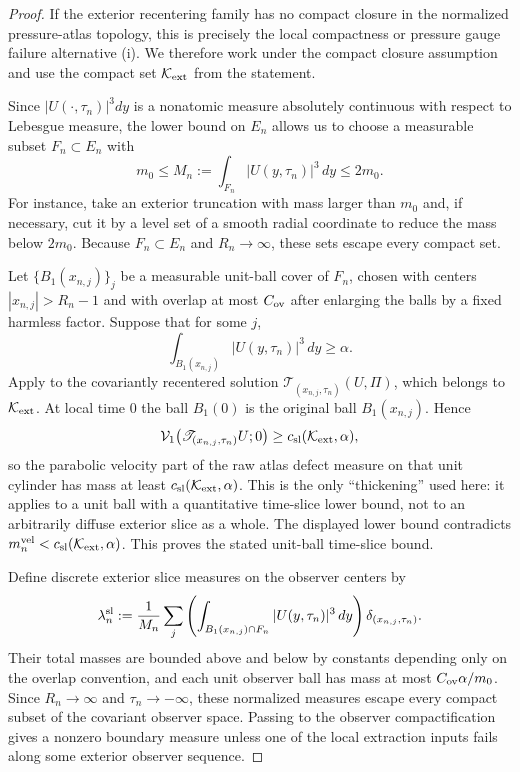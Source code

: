 \documentclass[11pt]{amsart}
\numberwithin{equation}{section}
\theoremstyle{plain}
\theoremstyle{definition}
\theoremstyle{remark}
\newcommand{\Vel}{\mathcal V}
\newcommand{\calK}{\mathcal K}
\begin{document}
\begin{proof}
If the exterior recentering family has no compact closure in the normalized
pressure-atlas topology, this is precisely the local compactness or pressure
gauge failure alternative \textup{(i)}.  We therefore work under the compact
closure assumption and use the compact set \(\calK_{\rm ext}\) from the
statement.

Since \(|U(\cdot,\tau_n)|^3dy\) is a nonatomic measure absolutely continuous
with respect to Lebesgue measure, the lower bound on \(E_n\) allows us to
choose a measurable subset \(F_n\subset E_n\) with
\[
   m_0\le M_n:=\int_{F_n}|U(y,\tau_n)|^3\,dy\le2m_0 .
\]
For instance, take an exterior truncation with mass larger than \(m_0\) and,
if necessary, cut it by a level set of a smooth radial coordinate to reduce the
mass below \(2m_0\).  Because \(F_n\subset E_n\) and \(R_n\to\infty\), these
sets escape every compact set.

Let \(\{B_1(x_{n,j})\}_j\) be a measurable unit-ball cover of \(F_n\), chosen
with centers \(|x_{n,j}|>R_n-1\) and with overlap at most \(C_{\rm ov}\) after
enlarging the balls by a fixed harmless factor.  Suppose that for some \(j\),
\[
   \int_{B_1(x_{n,j})}|U(y,\tau_n)|^3\,dy\ge\alpha .
\]
Apply  to the covariantly recentered
solution \(\mathscr T_{(x_{n,j},\tau_n)}(U,\Pi)\), which belongs to
\(\calK_{\rm ext}\).  At local time \(0\) the ball \(B_1(0)\) is the original
ball \(B_1(x_{n,j})\).  Hence
\[
   \Vel_1\!\left(\mathscr T_{(x_{n,j},\tau_n)}U;0\right)
   \ge c_{\rm sl}(\calK_{\rm ext},\alpha),
\]
so the parabolic velocity part of the raw atlas defect measure on that unit
cylinder has mass at least \(c_{\rm sl}(\calK_{\rm ext},\alpha)\).  This is the only
``thickening'' used here: it applies to a unit ball with a quantitative
time-slice lower bound, not to an arbitrarily diffuse exterior slice as a
whole.  The displayed lower bound contradicts
\(m_n^{\rm vel}<c_{\rm sl}(\calK_{\rm ext},\alpha)\).  This proves the stated
unit-ball time-slice bound.

Define discrete exterior slice measures on the observer centers by
\[
   \lambda_n^{\rm sl}
   :=
   \frac{1}{M_n}
   \sum_j
   \left(\int_{B_1(x_{n,j})\cap F_n}|U(y,\tau_n)|^3\,dy\right)
   \delta_{(x_{n,j},\tau_n)} .
\]
Their total masses are bounded above and below by constants depending only on
the overlap convention, and each unit observer ball has mass at most
\(C_{\rm ov}\alpha/m_0\).  Since \(R_n\to\infty\) and
\(\tau_n\to-\infty\), these normalized measures escape every compact subset of
the covariant observer space.  Passing to the observer compactification gives a
nonzero boundary measure unless one of the local extraction inputs fails along
some exterior observer sequence.


\end{proof}
\end{document}
